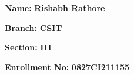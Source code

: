 \documentclass[12pt,,a4paper]{article}
\begin{document}
\textbf{\fontsize{14}{\baselineskip}\selectfont Name:} \hspace{\fill} \textbf{\fontsize{14}{\baselineskip}\selectfont Rishabh Rathore}
\bigskip

\textbf{\fontsize{14}{\baselineskip}\selectfont Branch:} \hspace{\fill} \textbf{\fontsize{14}{\baselineskip}\selectfont CSIT}


\bigskip

\textbf{\fontsize{14}{\baselineskip}\selectfont Section:} \hspace{\fill} \textbf{\fontsize{14}{\baselineskip}\selectfont III}

\bigskip

\textbf{\fontsize{14}{\baselineskip}\selectfont Enrollment No:} \hspace{\fill} \textbf{\fontsize{14}{\baselineskip}\selectfont 0827CI211155}
\clearpage

\end{document}
